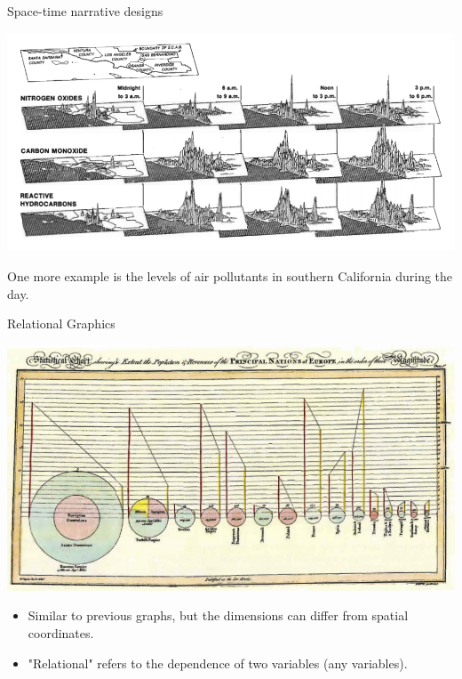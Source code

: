 \documentclass[
  ignorenonframetext,
]{beamer}
\begin{document}
\begin{frame}{Space-time narrative designs}
\protect\hypertarget{space-time-narrative-designs-2}{}
\begin{minipage}{1\textwidth}
\centering
\includegraphics[width=\textwidth]{excellence_figs/fig_23.png}
\end{minipage}
\hfill
\begin{minipage}{1\textwidth}
\footnotesize
\vspace{3mm}
One more example is the levels of air pollutants in southern California during the day.
\end{minipage}
\end{frame}

\begin{frame}{Relational Graphics}
\protect\hypertarget{relational-graphics}{}
\begin{minipage}{1\textwidth}
\centering
\includegraphics[width=\textwidth]{excellence_figs/fig_24.png}
\end{minipage}
\hfill \vspace{3mm}
\begin{minipage}{1\textwidth}
\footnotesize
\begin{itemize}
  \item Similar to previous graphs, but the dimensions can differ from spatial coordinates.
  \item "Relational" refers to the dependence of two variables (any variables).
\end{itemize}
\end{minipage}
\end{frame}
\end{document}
